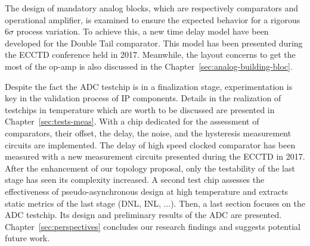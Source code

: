 The design of mandatory analog blocks, which are respectively comparators and operational amplifier, is examined to ensure the expected behavior for a rigorous 6\(\sigma\) process variation. To achieve this, a new time delay model have been developed for the Double Tail comparator. This model has been presented during the ECCTD conference held in 2017. Meanwhile, the layout concerns to get the most of the op-amp is also discussed in the Chapter~\ref{sec:analog-building-bloc}.

Despite the fact the ADC testchip is in a finalization stage, experimentation is key in the validation process of IP components. Details in the realization of testchips in temperature which are worth to be discussed are presented in Chapter~\ref{sec:tests-meas}. With a chip dedicated for the assessment of comparators, their offset, the delay, the noise, and the hysteresis measurement circuits are implemented. The delay of high speed clocked comparator has been measured with a new measurement circuits presented during the ECCTD in 2017. After the enhancement of our topology proposal, only the testability of the last stage has seen its complexity increased. A second test chip assesses the effectiveness of pseudo-asynchronous design at high temperature and extracts static metrics of the last stage (DNL, INL, ...). Then, a last section focuses on the ADC testchip. Its design and preliminary results of the ADC are presented. Chapter~\ref{sec:perspectives} concludes our research findings and suggests potential future work.
